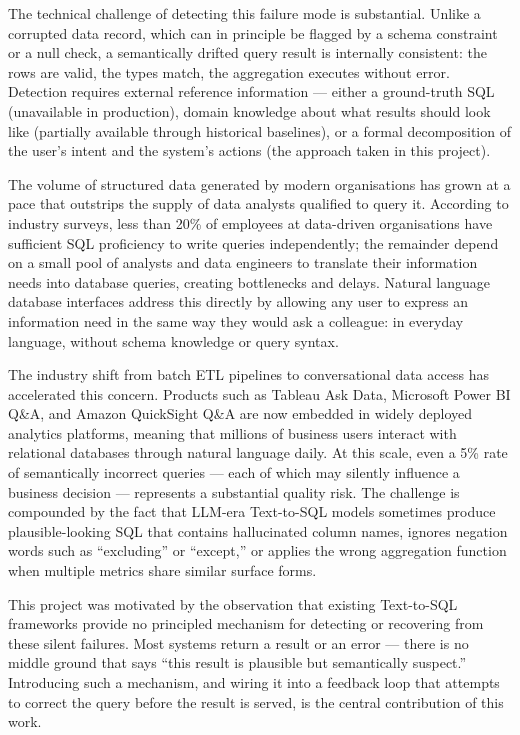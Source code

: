 \documentclass[12pt,a4paper]{report}
\begin{document}
The technical challenge of detecting this failure mode is substantial. Unlike a corrupted data record, which can in principle be flagged by a schema constraint or a null check, a semantically drifted query result is internally consistent: the rows are valid, the types match, the aggregation executes without error. Detection requires external reference information — either a ground-truth SQL (unavailable in production), domain knowledge about what results should look like (partially available through historical baselines), or a formal decomposition of the user's intent and the system's actions (the approach taken in this project).

The volume of structured data generated by modern organisations has grown at a pace that outstrips the supply of data analysts qualified to query it. According to industry surveys, less than 20\% of employees at data-driven organisations have sufficient SQL proficiency to write queries independently; the remainder depend on a small pool of analysts and data engineers to translate their information needs into database queries, creating bottlenecks and delays. Natural language database interfaces address this directly by allowing any user to express an information need in the same way they would ask a colleague: in everyday language, without schema knowledge or query syntax.

The industry shift from batch ETL pipelines to conversational data access has accelerated this concern. Products such as Tableau Ask Data, Microsoft Power BI Q\&A, and Amazon QuickSight Q\&A are now embedded in widely deployed analytics platforms, meaning that millions of business users interact with relational databases through natural language daily. At this scale, even a 5\% rate of semantically incorrect queries — each of which may silently influence a business decision — represents a substantial quality risk. The challenge is compounded by the fact that \ac{LLM}-era Text-to-SQL models sometimes produce plausible-looking \ac{SQL} that contains hallucinated column names, ignores negation words such as ``excluding'' or ``except,'' or applies the wrong aggregation function when multiple metrics share similar surface forms.

This project was motivated by the observation that existing Text-to-SQL frameworks provide no principled mechanism for detecting or recovering from these silent failures. Most systems return a result or an error — there is no middle ground that says ``this result is plausible but semantically suspect.'' Introducing such a mechanism, and wiring it into a feedback loop that attempts to correct the query before the result is served, is the central contribution of this work.
\end{document}
